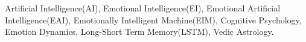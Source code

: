 Artificial Intelligence(AI), Emotional Intelligence(EI), Emotional Artificial Intelligence(EAI), Emotionally Intelligent Machine(EIM), Cognitive Psychology, Emotion Dynamics, Long-Short Term Memory(LSTM), Vedic Astrology.